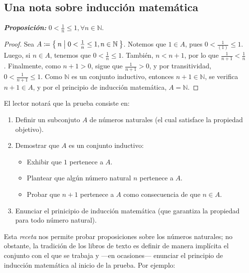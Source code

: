 \documentclass[11pt]{article}
\newcommand{\N}{\mathbb{N}}
\newcommand{\defined}{\coloneqq}
\newcommand{\bfit}[1]{\textbf{\textit{#1}}}
\let\set\Set
\begin{document}
\pagebreak

\subsection*{Una nota sobre inducción matemática}

\bfit{Proposición:} $0<\frac{1}{n}\leq 1, \forall n\in \N$. \begin{proof}
  Sea $A \defined \set{n|0<\frac{1}{n} \leq 1, n\in \N}$. Notemos que $1\in A$, pues $0<\frac{1}{(1)} \leq 1$. Luego, si $n\in A$, tenemos que $0<\frac{1}{n} \leq 1$. También, $n<n+1$, por lo que $\frac{1}{n+1} < \frac{1}{n}$. Finalmente, como $n+1>0$, sigue que $\frac{1}{n+1}>0$, y por transitividad, $0<\frac{1}{n+1}\leq 1$. Como $\N$ es un conjunto inductivo, entonces $n+1\in \N$, se verifica $n+1\in A$, y por el principio de inducción matemática, $A =\N$.
\end{proof}

El lector notará que la prueba consiste en: \begin{enumerate}
  \item Definir un subconjuto $A$ de números naturales (el cual satisface la propiedad objetivo).
  \item Demostrar que $A$ es un conjunto inductivo: \begin{itemize}
    \item Exhibir que $1$ pertenece a $A$.
    \item Plantear que algún número natural $n$ pertenece a $A$.
    \item Probar que $n+1$ pertenece a $A$ como consecuencia de que $n\in A$.
  \end{itemize}
  \item Enunciar el prinicipio de inducción matemática (que garantiza la propiedad para todo número natural).
\end{enumerate}

Esta \textit{receta} nos permite probar proposiciones sobre los números naturales; no obstante, la tradición de los libros de texto es definir de manera implícita el conjunto con el que se trabaja y —en ocasiones— enunciar el principio de inducción matemática al inicio de la prueba. Por ejemplo:
\end{document}
